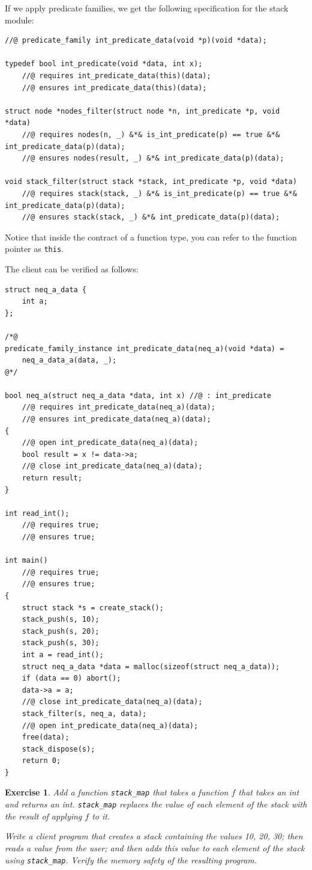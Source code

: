 \documentclass{article}
\newtheorem{exercise}{Exercise}
\begin{document}
If we apply predicate families, we get the following
specification for the stack module:
\begin{lstlisting}
//@ predicate_family int_predicate_data(void *p)(void *data);

typedef bool int_predicate(void *data, int x);
    //@ requires int_predicate_data(this)(data);
    //@ ensures int_predicate_data(this)(data);

struct node *nodes_filter(struct node *n, int_predicate *p, void *data)
    //@ requires nodes(n, _) &*& is_int_predicate(p) == true &*& int_predicate_data(p)(data);
    //@ ensures nodes(result, _) &*& int_predicate_data(p)(data);

void stack_filter(struct stack *stack, int_predicate *p, void *data)
    //@ requires stack(stack, _) &*& is_int_predicate(p) == true &*& int_predicate_data(p)(data);
    //@ ensures stack(stack, _) &*& int_predicate_data(p)(data);
\end{lstlisting}
Notice that inside the contract of a function type, you can
refer to the function pointer as \lstinline!this!.

The client can be verified as follows:
\begin{lstlisting}
struct neq_a_data {
    int a;
};

/*@
predicate_family_instance int_predicate_data(neq_a)(void *data) =
    neq_a_data_a(data, _);
@*/

bool neq_a(struct neq_a_data *data, int x) //@ : int_predicate
    //@ requires int_predicate_data(neq_a)(data);
    //@ ensures int_predicate_data(neq_a)(data);
{
    //@ open int_predicate_data(neq_a)(data);
    bool result = x != data->a;
    //@ close int_predicate_data(neq_a)(data);
    return result;
}

int read_int();
    //@ requires true;
    //@ ensures true;

int main()
    //@ requires true;
    //@ ensures true;
{
    struct stack *s = create_stack();
    stack_push(s, 10);
    stack_push(s, 20);
    stack_push(s, 30);
    int a = read_int();
    struct neq_a_data *data = malloc(sizeof(struct neq_a_data));
    if (data == 0) abort();
    data->a = a;
    //@ close int_predicate_data(neq_a)(data);
    stack_filter(s, neq_a, data);
    //@ open int_predicate_data(neq_a)(data);
    free(data);
    stack_dispose(s);
    return 0;
}
\end{lstlisting}

\begin{exercise}\label{exercise:map}
Add a function \lstinline!stack_map! that takes a function $f$
that takes an int and returns an int. \lstinline!stack_map!
replaces the value of each element of the stack with the result
of applying $f$ to it.

Write a client program that creates a stack containing the
values 10, 20, 30; then reads a value from the user; and then
adds this value to each element of the stack using
\lstinline!stack_map!. Verify the memory safety of the
resulting program.
\end{exercise}
\end{document}
